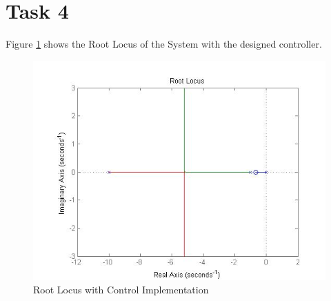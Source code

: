 \documentclass[12pt,letter]{article}
\begin{document}
\section*{Task 4}
Figure \ref{fig:controlledrootlocus} shows the Root Locus of the System with the designed controller.
\begin{figure}[H]
\centering
\includegraphics[width=1\linewidth]{controlledrootlocus}
\caption{Root Locus with Control Implementation}
\label{fig:controlledrootlocus}
\end{figure}
\end{document}
